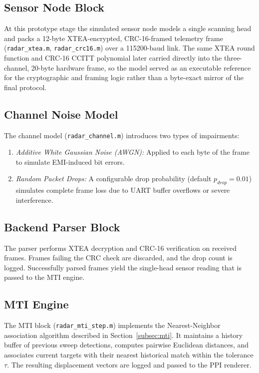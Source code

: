 \documentclass[conference]{IEEEtran}
\begin{document}
\subsection{Sensor Node Block}
At this prototype stage the simulated sensor node models a single scanning head and packs a 12-byte XTEA-encrypted, CRC-16-framed telemetry frame (\texttt{radar\_xtea.m}, \texttt{radar\_crc16.m}) over a 115200-baud link. The same XTEA round function and CRC-16 CCITT polynomial later carried directly into the three-channel, 20-byte hardware frame, so the model served as an executable reference for the cryptographic and framing logic rather than a byte-exact mirror of the final protocol.

\subsection{Channel Noise Model}
The channel model (\texttt{radar\_channel.m}) introduces two types of impairments:
\begin{enumerate}
    \item \textit{Additive White Gaussian Noise (AWGN):} Applied to each byte of the frame to simulate EMI-induced bit errors.
    \item \textit{Random Packet Drops:} A configurable drop probability (default $p_{drop} = 0.01$) simulates complete frame loss due to UART buffer overflows or severe interference.
\end{enumerate}

\subsection{Backend Parser Block}
The parser performs XTEA decryption and CRC-16 verification on received frames. Frames failing the CRC check are discarded, and the drop count is logged. Successfully parsed frames yield the single-head sensor reading that is passed to the MTI engine.

\subsection{MTI Engine}
The MTI block (\texttt{radar\_mti\_step.m}) implements the Nearest-Neighbor association algorithm described in Section~\ref{subsec:mti}. It maintains a history buffer of previous sweep detections, computes pairwise Euclidean distances, and associates current targets with their nearest historical match within the tolerance $\tau$. The resulting displacement vectors are logged and passed to the PPI renderer.
\end{document}
